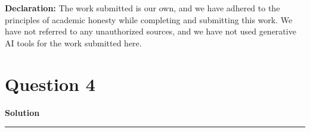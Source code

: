 \documentclass[a4paper,12pt]{article}
\title{\cooltitle{CS754 Assignment-2}}
\author{{\bf Saksham Rathi, Ekansh Ravi Shankar, Kshitij Vaidya}}
\date{}
\newenvironment{solution}[2][]{%
    \begin{mdframed}[linecolor=blue!70!black, linewidth=2pt, roundcorner=10pt, backgroundcolor=yellow!10!white, skipabove=12pt, skipbelow=12pt]%
        \textbf{\large #2}
        \par\noindent\rule{\textwidth}{0.4pt}
}{
    \end{mdframed}
}
\begin{document}
\maketitle
\textbf{Declaration:} The work submitted is our own, and
we have adhered to the principles of academic honesty while completing and submitting this work. We have not referred to any unauthorized sources, and we have not used generative AI tools for the work submitted here.

\section*{Question 4}

\begin{solution}{Solution}

\end{solution}
\end{document}
